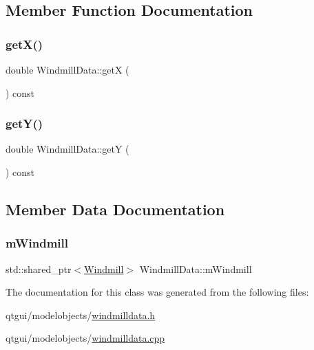 \subsection{Member Function Documentation}
\mbox{\label{class_windmill_data_a9cbd41017d829b127481600064a4d8a1}} 
\subsubsection{\texorpdfstring{getX()}{getX()}}
{\footnotesize\ttfamily double Windmill\+Data\+::getX (\begin{DoxyParamCaption}{ }\end{DoxyParamCaption}) const}

\mbox{\label{class_windmill_data_a462411cd37254945bc59162f1a7505da}} 
\subsubsection{\texorpdfstring{getY()}{getY()}}
{\footnotesize\ttfamily double Windmill\+Data\+::getY (\begin{DoxyParamCaption}{ }\end{DoxyParamCaption}) const}



\subsection{Member Data Documentation}
\mbox{\label{class_windmill_data_a44143e28d15d0c574372c313ac9c693b}} 
\subsubsection{\texorpdfstring{mWindmill}{mWindmill}}
{\footnotesize\ttfamily std\+::shared\+\_\+ptr$<$\mbox{\hyperlink{class_windmill}{Windmill}}$>$ Windmill\+Data\+::m\+Windmill}



The documentation for this class was generated from the following files\+:\begin{DoxyCompactItemize}
\item 
qtgui/modelobjects/\mbox{\hyperlink{windmilldata_8h}{windmilldata.\+h}}\item 
qtgui/modelobjects/\mbox{\hyperlink{windmilldata_8cpp}{windmilldata.\+cpp}}\end{DoxyCompactItemize}
